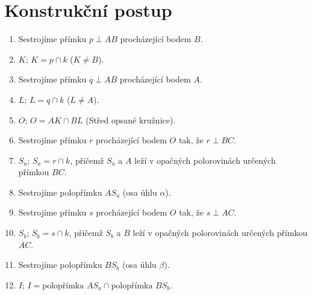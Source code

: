 \documentclass{MO}
\begin{document}
\newpage
\section*{Konstrukční postup}

\begin{enumerate}[label=\textbf{\arabic*.}]
    \item Sestrojíme přímku $p \perp AB$ procházející bodem $B$.
    \item $K$; $K = p \cap k$ ($K \neq B$).
    \item Sestrojíme přímku $q \perp AB$ procházející bodem $A$.
    \item $L$; $L = q \cap k$ ($L \neq A$).
    \item $O$; $O = AK \cap BL$ (Střed opsané kružnice).
    \item Sestrojíme přímku $r$ procházející bodem $O$ tak, že $r \perp BC$.
    \item $S_a$; $S_a = r \cap k$, přičemž $S_a$ a $A$ leží v opačných polorovinách určených přímkou $BC$.
    \item Sestrojíme polopřímku $AS_a$ (osa úhlu $\alpha$).
    \item Sestrojíme přímku $s$ procházející bodem $O$ tak, že $s \perp AC$.
    \item $S_b$; $S_b = s \cap k$, přičemž $S_b$ a $B$ leží v opačných polorovinách určených přímkou $AC$.
    \item Sestrojíme polopřímku $BS_b$ (osa úhlu $\beta$).
    \item $I$; $I = \text{polopřímka } AS_a \cap \text{polopřímka } BS_b$.
\end{enumerate}

\vspace{1.5cm}
\end{document}
